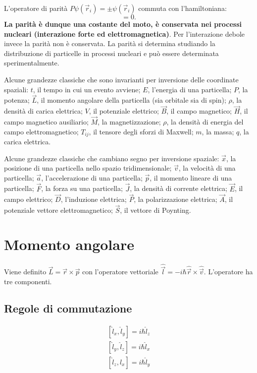 \documentclass[a4paper,11pt,twoside,openany]{book}
\theoremstyle{definition}
\theoremstyle{plain}
\theoremstyle{plain}
\theoremstyle{definition}
\begin{document}
L'operatore di parità $P\psi(\vec r_i)=\pm\psi(\vec r_i)$ commuta con l'hamiltoniana:
\begin{equation}
[P,H]=0.
\end{equation}
\textbf{La parità è dunque una costante del moto, è conservata nei processi nucleari (interazione forte ed elettromagnetica)}. Per l'interazione debole invece la parità non è conservata. La parità si determina studiando la distribuzione di particelle in processi nucleari e può essere determinata sperimentalmente.

Alcune grandezze classiche che sono invarianti per inversione delle coordinate spaziali: $t$, il tempo in cui un evento avviene; $E$, l'energia di una particella; $P$, la potenza; $\vec L$, il momento angolare della particella (sia orbitale sia di spin); $\rho$, la densità di carica elettrica; $V$, il potenziale elettrico; $\vec B$, il campo magnetico; $\vec H$, il campo magnetico ausiliario; $\vec M$, la magnetizzazione; $\rho$, la densità di energia del campo elettromagnetico; $T_{ij}$, il tensore degli sforzi di Maxwell; $m$, la massa; $q$, la carica elettrica.

Alcune grandezze classiche che cambiano segno per inversione spaziale: $\vec x$, la posizione di una particella nello spazio tridimensionale; $\vec v$, la velocità di una particella; $\vec a$, l'accelerazione di una particella; $\vec p$, il momento lineare di una particella; $\vec F$, la forza su una particella; $\vec J$, la densità di corrente elettrica; $\vec E$, il campo elettrico; $\vec D$, l'induzione elettrica; $\vec P$, la polarizzazione elettrica; $\vec A$, il potenziale vettore elettromagnetico; $\vec S$, il vettore di Poynting.


\section{Momento angolare} %
Viene definito $\vec L=\vec r \times \vec p$ con l'operatore vettoriale $\hat {\vec l}=-i\hbar \hat{\vec r} \times \hat{\vec v}$. L'operatore ha tre componenti.

\subsection{Regole di commutazione} %
\begin{equation}\begin{split}
\left[\hat l_x,\hat l_y\right]=i\hbar \hat l_z\\
\left[\hat l_y,\hat l_z\right]=i\hbar \hat l_x\\
\left[\hat l_z,\hat l_x\right]=i\hbar \hat l_y
\end{split}\end{equation}
\end{document}
